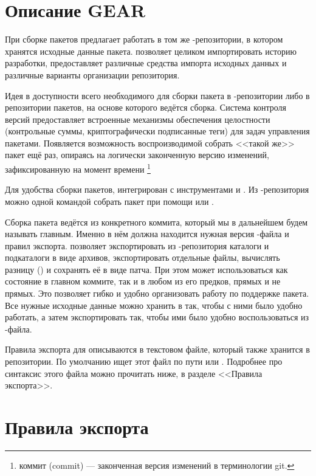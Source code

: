 \section{Описание GEAR}
При сборке пакетов  предлагает работать в том же -репозитории,
в котором хранятся исходные данные пакета.  позволяет целиком импортировать
историю разработки, предоставляет различные средства импорта исходных данных и
различные варианты организации репозитория.

Идея  в доступности всего необходимого для сборки пакета в -репозитории
либо в репозитории пакетов, на основе которого ведётся сборка. Система контроля версий
 предоставляет встроенные механизмы обеспечения целостности (контрольные суммы,
криптографически подписанные теги) для задач управления пакетами. Появляется возможность
воспроизводимой собрать <<такой же>> пакет ещё раз, опираясь на логически
законченную версию изменений, зафиксированную на момент времени%
\footnote{коммит (commit) --- законченная версия изменений в терминологии git.}

Для удобства сборки пакетов,  интегрирован с инструментами  и
. Из -репозитория можно одной командой собрать пакет при помощи
 или .

Сборка пакета ведётся из конкретного коммита, который мы в дальнейшем будем называть главным.
Именно в нём должна находится нужная версия -файла и правил экспорта. 
позволяет экспортировать из -репозитория каталоги и подкаталоги в виде архивов,
экспортировать отдельные файлы, вычислять разницу () и сохранять её в виде патча.
При этом может использоваться как состояние в главном коммите, так и в любом из его предков,
прямых и не прямых. Это позволяет гибко и удобно организовать работу по поддержке пакета.
Все нужные исходные данные можно хранить в  так, чтобы с ними было удобно работать,
а затем экспортировать так, чтобы ими было удобно воспользоваться из -файла.

Правила экспорта для  описываются в текстовом файле, который также хранится в
репозитории. По умолчанию  ищет этот файл по пути  или .
Подробнее про синтаксис этого файла можно прочитать ниже, в разделе <<Правила экспорта>>.

\section{Правила экспорта}

